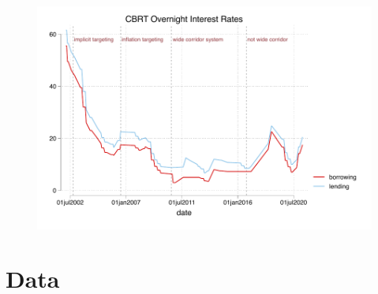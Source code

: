 \documentclass{article}
\begin{document}
    \begin{figure}[H]
        \centering
        \includegraphics[width=\linewidth]{turkey_taylor/cb_oni.pdf}
    \end{figure}

\section{Data}
\end{document}
